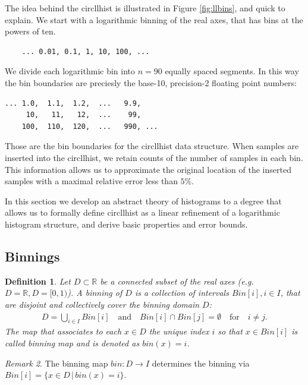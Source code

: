 \documentclass{article}
\theoremstyle{plain}
\newtheorem{definition}{Definition}[section]
\theoremstyle{remark}
\newtheorem{remark}[definition]{Remark}
\newcommand{\IR}{\mathbb{R}}
\newcommand{\Union}{\bigcup}
\newcommand{\qtext}[1]{\quad\text{#1}\quad} %
\newcommand{\ra}{\rightarrow}
\begin{document}
The idea behind the circllhist is illustrated in Figure \ref{fig:llbins}, and quick to explain.
We start with a logarithmic binning of the real axes, that has bins at the powers of ten.
\begin{center}
  \begin{BVerbatim}
    ... 0.01, 0.1, 1, 10, 100, ...
  \end{BVerbatim}
\end{center}
We divide each logarithmic bin into $n=90$ equally spaced segments. In this way the bin boundaries
are preciesly the base-10, precision-2 floating point numbers:
\begin{center}
\begin{BVerbatim}
... 1.0,  1.1,  1.2,  ...   9.9,
     10,   11,   12,  ...    99,
    100,  110,  120,  ...   990, ...
\end{BVerbatim}
\end{center}
Those are the bin boundaries for the circllhist data structure.
When samples are inserted into the circllhist, we retain counts of the number of samples in each bin.
This information allows us to approximate the original location of the inserted samples with a
maximal relative error less than $5\%$.

In this section we develop an abstract theory of histograms to a degree that allows us to
formally define circllhist as a linear refinement of a logarithmic histogram structure,
and derive basic properties and error bounds.

\subsection{Binnings}

\begin{definition}
  Let $D \subset \IR$ be a connected subset of the real axes (e.g. $D=\IR, D=[0,1)$).
  A binning of $D$ is a collection of intervals $Bin[i], i \in I$, that are disjoint and collectively cover the binning domain $D$:
  \begin{align*}
    D = \Union_{i\in I} Bin[i] \qtext{and} Bin[i] \cap Bin[j] = \emptyset \qtext{for} i \neq j.
  \end{align*}
  The map that associates to each $x \in D$ the unique index $i$ so that $x \in Bin[i]$ is called
  binning map and is denoted as $bin(x) = i$.
\end{definition}

\begin{remark}
  The binning map $bin: D \ra I$ determines the binning via $Bin[i] = \{ x \in D \,|\, bin(x) = i \}$.
\end{remark}
\end{document}
